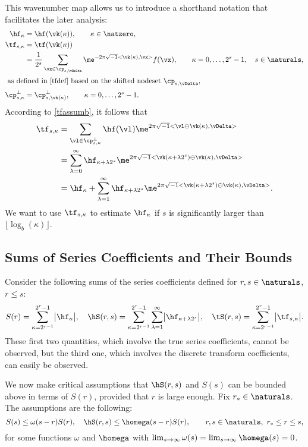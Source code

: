 \documentclass[]{elsarticle}
\theoremstyle{definition}
\theoremstyle{remark}
\begin{document}
This wavenumber map allows us to introduce a shorthand notation that facilitates the later analysis:
\begin{align*}
\hf_{\kappa} & =\hf(\vk(\kappa)), \qquad \kappa \in \natzero,\\
\tf_{s,\kappa}& = \tf(\vk(\kappa)) \\
& = \frac{1}{2^s} \sum_{\vx \in \cp_{s,\vDelta}} \me^{-2 \pi \sqrt{-1} <\vk(\kappa) , \vx>} f(\vx), \qquad \kappa=0, \ldots, 2^s-1, \quad s \in \naturals,\\
\intertext{ as defined in \eqref{tfdef} based on the shifted nodeset $\cp_{s,\vDelta}$,}
\cp^{\perp}_{s,\kappa}&=\cp^{\perp}_{s,\vk(\kappa)}, \qquad \kappa=0, \ldots, 2^s-1.
\end{align*}
According to \eqref{tfassumb}, it follows that
\begin{align}
\nonumber
\tf_{s,\kappa} &= \sum_{\vl \in \cp^{\perp}_{s,\kappa}} \hf(\vl) \me^{2 \pi \sqrt{-1} <\vl \ominus \vk(\kappa), \vDelta>} \\
\nonumber
&= \sum_{\lambda=0}^{\infty} \hf_{\kappa+\lambda 2^{s}} \me^{2 \pi \sqrt{-1} <\vk(\kappa+\lambda 2^{s}) \ominus \vk(\kappa) , \vDelta>} \\
& = \hf_{\kappa} + \sum_{\lambda=1}^{\infty} \hf_{\kappa+\lambda 2^{s}} \me^{2 \pi \sqrt{-1} <\vk(\kappa+\lambda 2^{s}) \ominus \vk(\kappa) , \vDelta>}.
\label{tfassumc}
\end{align}
We want to use $\tf_{s,\kappa}$ to estimate $\hf_{\kappa}$ if $s$ is significantly larger than $\lfloor \log_b(\kappa) \rfloor$.

\subsection{Sums of Series Coefficients and Their Bounds}
Consider the following sums of the series coefficients defined for $r,s \in \naturals$, $r \le s$:
\begin{equation}
S(r) =  \sum_{\kappa=2^{r-1}}^{2^{r}-1} \bigl \lvert \hf_{\kappa} \bigr \rvert, \quad
\hS(r,s)  = \sum_{\kappa=2^{r-1}}^{2^{r}-1} \sum_{\lambda=1}^{\infty} \bigl \lvert \hf_{\kappa+\lambda 2^{s}}\bigr\rvert, \quad
\tS(r,s) = \sum_{\kappa=2^{r-1}}^{2^{r}-1} \bigl \lvert \tf_{s,\kappa}\bigr\rvert.
\end{equation}
These first two quantities, which involve the true series coefficients, cannot be observed, but the third one, which involves the discrete transform coefficients, can easily be observed.

We now make critical assumptions that $\hS(r,s)$ and $S(s)$ can be bounded above in terms of $S(r)$, provided that $r$ is large enough.  Fix $r_* \in \naturals$.  The assumptions are the following:
\begin{equation}
S(s) \le \omega(s-r) S(r), \quad \hS(r,s) \le \homega(s-r) S(r), \qquad r,s \in \naturals, \ r_* \le r \le s,
\end{equation}
for some functions $\omega$ and $\homega$ with $\lim_{s \to \infty} \omega(s) = \lim_{s \to \infty} \homega(s) = 0$.
\end{document}
